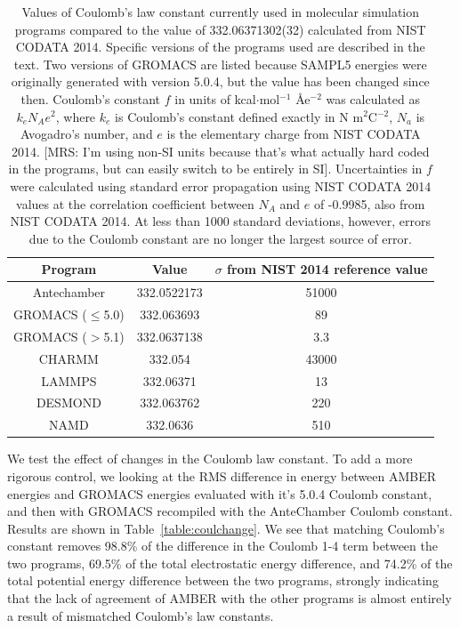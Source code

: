 \begin{table}
\caption{Values of Coulomb's law constant currently used in molecular
  simulation programs compared to the value of 332.06371302(32)
  calculated from NIST CODATA 2014. Specific versions of the programs
  used are described in the text. Two versions of GROMACS are listed
  because SAMPL5 energies were originally generated with version
  5.0.4, but the value has been changed since then. Coulomb's constant
  $f$ in units of kcal$\cdot$mol$^{-1}$ \AA e$^{-2}$ was calculated as
  $k_e N_A e^2$, where $k_e$ is Coulomb's constant defined exactly in
  N m$^2$C$^{-2}$, $N_a$ is Avogadro's number, and $e$ is the
  elementary charge from NIST CODATA 2014. [MRS: I'm using non-SI
    units because that's what actually hard coded in the programs, but
    can easily switch to be entirely in SI]. Uncertainties in $f$ were
  calculated using standard error propagation using NIST CODATA 2014
  values at the correlation coefficient between $N_A$ and $e$ of
  -0.9985, also from NIST CODATA 2014. At less than 1000 standard
  deviations, however, errors due to the Coulomb constant are no
  longer the largest source of error.\label{tab:delfromnist}}
\begin{tabular}{|ccc|}
\hline
Program & Value & $\sigma$ from NIST 2014 reference value \\
\hline
Antechamber &  332.0522173 & 51000 \\
GROMACS ($\leq$5.0) & 332.063693 & 89 \\
GROMACS ($>$5.1) & 332.0637138 & 3.3 \\ 
CHARMM & 332.054 & 43000 \\
LAMMPS & 332.06371 &  13 \\
DESMOND & 332.063762 & 220 \\
NAMD & 332.0636 & 510 \\
\hline
\end{tabular}
\end{table}

We test the effect of changes in the Coulomb law constant.  To add a
more rigorous control, we looking at the RMS difference in energy
between AMBER energies and GROMACS energies evaluated with it's 5.0.4
Coulomb constant, and then with GROMACS recompiled with the
AnteChamber Coulomb constant.  Results are shown in
Table~\ref{table:coulchange}. We see that matching Coulomb's constant
removes 98.8\% of the difference in the Coulomb 1-4 term between the
two programs, 69.5\% of the total electrostatic energy difference, and
74.2\% of the total potential energy difference between the two
programs, strongly indicating that the lack of agreement of AMBER with
the other programs is almost entirely a result of mismatched Coulomb's
law constants.


